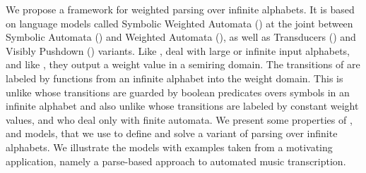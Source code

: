 %
%
We propose a framework for weighted parsing over infinite alphabets.
%
It is based on language models called Symbolic Weighted Automata (\SWA)
at the joint %
between Symbolic Automata (\SA) and Weighted Automata (\WA),
as well as Transducers (\SWT) and Visibly Pushdown (\SWVPA) variants.
%
Like \SA, \SWA deal with large or infinite input alphabets,
and like \WA, they output a weight value in a semiring domain.
The transitions of \SWA are labeled by functions from an infinite alphabet into the weight domain.
This is unlike \SA whose transitions are guarded by boolean predicates
overs symbols in an infinite alphabet
and also unlike \WA whose transitions are labeled by constant weight values,
and who deal only with finite automata.
%
We present some properties of \SWA, \SWT and \SWVPA models,
that we use to define and solve a variant of parsing
over infinite alphabets.
%
We illustrate the models with examples taken from
a motivating application, namely
a parse-based approach to automated music transcription.
